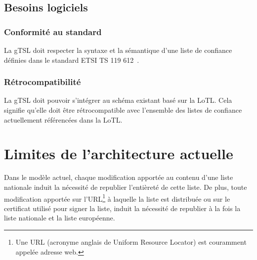 \documentclass{tnreport}
\begin{document}
\subsection{Besoins logiciels}

\subsubsection{Conformité au standard}

La gTSL doit respecter la syntaxe et la sémantique d'une liste de confiance définies dans le standard ETSI TS 119 612~\cite{ETSITS119612}.

\subsubsection{Rétrocompatibilité}

La gTSL doit pouvoir s'intégrer au schéma existant basé sur la LoTL. Cela signifie qu'elle doit être rétrocompatible avec l'ensemble des listes de confiance actuellement référencées dans la LoTL.

\section{Limites de l'architecture actuelle}
\label{sec:limits}

Dans le modèle actuel, chaque modification apportée au contenu d'une liste nationale induit la nécessité de republier l'entièreté de cette liste. De plus, toute modification apportée sur l'URL\footnote{Une URL (acronyme anglais de Uniform Resource Locator) est couramment appelée adresse web.} à laquelle la liste est distribuée ou sur le certificat utilisé pour signer la liste, induit la nécessité de republier à la fois la liste nationale et la liste européenne.
\end{document}
